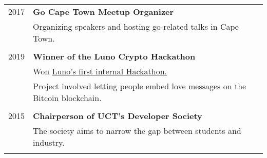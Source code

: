 \documentclass[a4paper,10pt]{article} %
\begin{document}
\begin{tabular}{rl}



\textsc{2017} & \textbf{Go Cape Town Meetup Organizer}\\
& Organizing speakers and hosting go-related talks in Cape Town.\\
&\\
\textsc{2019} & \textbf{Winner of the Luno Crypto Hackathon}\\
& Won  \href{https://www.luno.com/blog/en/post/luno-hackathon-2019}{Luno's first internal Hackathon.} \\
& Project involved letting people embed love messages on the Bitcoin blockchain.\\
&\\
\textsc{2015} & \textbf{Chairperson of UCT's Developer Society}\\
& The society aims to narrow the gap between students and industry. \\
&\\



\end{tabular}
\end{document}
